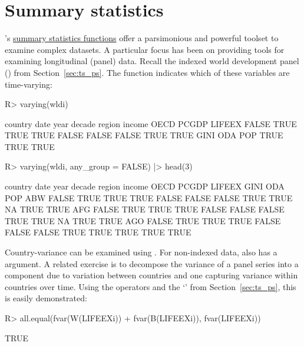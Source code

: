 \documentclass[nojss]{jss} %
\newcommand{\class}[1]{`\code{#1}'}
\newcommand{\fct}[1]{\code{#1()}}
\begin{document}
\section{Summary statistics} \label{sec:summ_stat}
%
's \href{https://sebkrantz.github.io/collapse/reference/summary-statistics.html}{summary statistics functions} offer a parsimonious and powerful toolset to examine complex datasets. A particular focus has been on providing tools for examining longitudinal (panel) data. Recall the indexed world development panel () from Section~\ref{sec:ts_ps}. The function \fct{varying} indicates which of these variables are time-varying:
%
\begin{Schunk}
\begin{Sinput}
R> varying(wldi)
\end{Sinput}
\begin{Soutput}
country    date    year  decade  region  income    OECD   PCGDP  LIFEEX 
  FALSE    TRUE    TRUE    TRUE   FALSE   FALSE   FALSE    TRUE    TRUE 
   GINI     ODA     POP 
   TRUE    TRUE    TRUE 
\end{Soutput}
\begin{Sinput}
R> varying(wldi, any_group = FALSE) |> head(3)
\end{Sinput}
\begin{Soutput}
    country date year decade region income  OECD PCGDP LIFEEX GINI  ODA  POP
ABW   FALSE TRUE TRUE   TRUE  FALSE  FALSE FALSE  TRUE   TRUE   NA TRUE TRUE
AFG   FALSE TRUE TRUE   TRUE  FALSE  FALSE FALSE  TRUE   TRUE   NA TRUE TRUE
AGO   FALSE TRUE TRUE   TRUE  FALSE  FALSE FALSE  TRUE   TRUE TRUE TRUE TRUE
\end{Soutput}
\end{Schunk}
%
Country-variance can be examined using . For non-indexed data, \fct{varying} also has a  argument. A related exercise is to decompose the variance of a panel series into a component due to variation between countries and one capturing variance within countries over time. Using the  operators and the  \class{indexed\_series} from Section~\ref{sec:ts_ps}, this is easily demonstrated:
%
\begin{Schunk}
\begin{Sinput}
R> all.equal(fvar(W(LIFEEXi)) + fvar(B(LIFEEXi)), fvar(LIFEEXi))
\end{Sinput}
\begin{Soutput}
[1] TRUE
\end{Soutput}
\end{Schunk}
\end{document}
